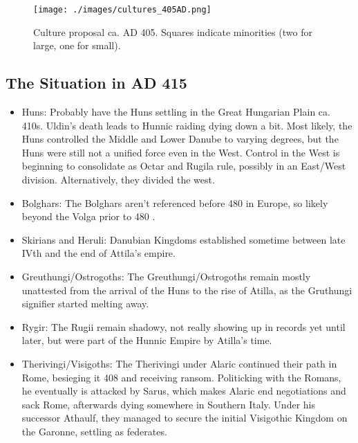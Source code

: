 \documentclass{article}
\begin{document}
	\begin{figure}[h!]
		\centering
		\texttt{[image: ./images/cultures\_405AD.png]}
		\caption{Culture proposal ca. AD 405. Squares indicate minorities (two for large, one for small).}
	\end{figure}
	
	\newpage
	\subsection{The Situation in AD 415}
	\label{sec:timeline:subsec:415}
	
	\begin{itemize}
		\item Huns:\newline
		Probably have the Huns settling in the Great Hungarian Plain ca. 410s.
		Uldin's death leads to Hunnic raiding dying down a bit.
		Most likely, the Huns controlled the Middle and Lower Danube to varying degrees, but the Huns were still not a unified force even in the West.
		Control in the West is beginning to consolidate as Octar and Rugila rule, possibly in an East/West division.
		Alternatively, they divided the west.
		
		\item Bolghars:\newline
		The Bolghars aren't referenced before 480 in Europe, so likely beyond the Volga prior to 480 \cite{KimHuns}.
		
		\item Skirians and Heruli:\newline
		Danubian Kingdoms established sometime between late IVth and the end of Attila's empire.
		
		\item Greuthungi/Ostrogoths:\newline
		The Greuthungi/Ostrogoths remain mostly unattested from the arrival of the Huns to the rise of Atilla, as the Gruthungi signifier started melting away.
		
		\item Rygir:\newline
		The Rugii remain shadowy, not really showing up in records yet until later, but were part of the Hunnic Empire by Atilla's time.
		
		\item Therivingi/Visigoths:\newline
		The Therivingi under Alaric continued their path in Rome, besieging it 408 and receiving ransom.
		Politicking with the Romans, he eventually is attacked by Sarus, which makes Alaric end negotiations and sack Rome, afterwards dying somewhere in Southern Italy.
		Under his successor Athaulf, they managed to secure the initial Visigothic Kingdom on the Garonne, settling as federates.
		

\end{itemize}
\end{document}
